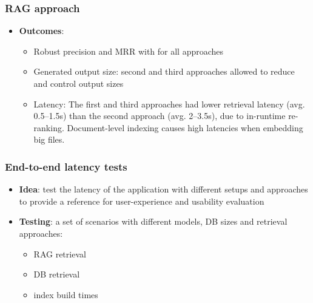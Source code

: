 \documentclass[10pt,aspectratio=169]{beamer}
\begin{document}
\begin{frame}
    \frametitle{RAG approach}
    \begin{itemize}
        \item \textbf{Outcomes}:
            \begin{itemize}
                \item Robust precision and MRR with for all approaches
                \item Generated output size: second and third approaches
                    allowed to reduce and control output sizes
                \item Latency: The first and third approaches had lower
                    retrieval latency (avg. 0.5--1.5s) than the second approach
                    (avg. 2--3.5s), due to in-runtime re-ranking. Document-level
                    indexing causes high latencies when embedding big files.
            \end{itemize}
    \end{itemize}
\end{frame}

\begin{frame}
    \frametitle{End-to-end latency tests}
    \begin{itemize}
        \item \textbf{Idea}: test the latency of the application with different
            setups and approaches to provide a reference for user-experience and
            usability evaluation
        \item \textbf{Testing}: a set of scenarios with different models, DB
            sizes and retrieval approaches:
            \begin{itemize}
                \item RAG retrieval
                \item DB retrieval
                \item index build times
            \end{itemize}
    \end{itemize}
\end{frame}
\end{document}
